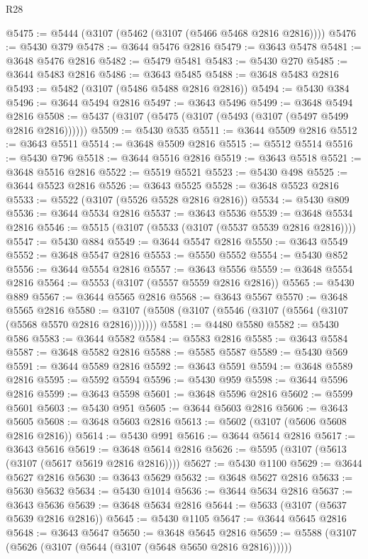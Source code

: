 \begin{lexlean}{R28}
\begin{coremodule}
@5475 := @5444 (@3107 (@5462 (@3107 (@5466 @5468 @2816 @2816))))
@5476 := @5430 @379
@5478 := @3644 @5476 @2816
@5479 := @3643 @5478
@5481 := @3648 @5476 @2816
@5482 := @5479 @5481
@5483 := @5430 @270
@5485 := @3644 @5483 @2816
@5486 := @3643 @5485
@5488 := @3648 @5483 @2816
@5493 := @5482 (@3107 (@5486 @5488 @2816 @2816))
@5494 := @5430 @384
@5496 := @3644 @5494 @2816
@5497 := @3643 @5496
@5499 := @3648 @5494 @2816
@5508 := @5437 (@3107 (@5475 (@3107 (@5493 (@3107 (@5497 @5499 @2816 @2816))))))
@5509 := @5430 @535
@5511 := @3644 @5509 @2816
@5512 := @3643 @5511
@5514 := @3648 @5509 @2816
@5515 := @5512 @5514
@5516 := @5430 @796
@5518 := @3644 @5516 @2816
@5519 := @3643 @5518
@5521 := @3648 @5516 @2816
@5522 := @5519 @5521
@5523 := @5430 @498
@5525 := @3644 @5523 @2816
@5526 := @3643 @5525
@5528 := @3648 @5523 @2816
@5533 := @5522 (@3107 (@5526 @5528 @2816 @2816))
@5534 := @5430 @809
@5536 := @3644 @5534 @2816
@5537 := @3643 @5536
@5539 := @3648 @5534 @2816
@5546 := @5515 (@3107 (@5533 (@3107 (@5537 @5539 @2816 @2816))))
@5547 := @5430 @884
@5549 := @3644 @5547 @2816
@5550 := @3643 @5549
@5552 := @3648 @5547 @2816
@5553 := @5550 @5552
@5554 := @5430 @852
@5556 := @3644 @5554 @2816
@5557 := @3643 @5556
@5559 := @3648 @5554 @2816
@5564 := @5553 (@3107 (@5557 @5559 @2816 @2816))
@5565 := @5430 @889
@5567 := @3644 @5565 @2816
@5568 := @3643 @5567
@5570 := @3648 @5565 @2816
@5580 := @3107 (@5508 (@3107 (@5546 (@3107 (@5564 (@3107 (@5568 @5570 @2816 @2816)))))))
@5581 := @4480 @5580
@5582 := @5430 @586
@5583 := @3644 @5582
@5584 := @5583 @2816
@5585 := @3643 @5584
@5587 := @3648 @5582 @2816
@5588 := @5585 @5587
@5589 := @5430 @569
@5591 := @3644 @5589 @2816
@5592 := @3643 @5591
@5594 := @3648 @5589 @2816
@5595 := @5592 @5594
@5596 := @5430 @959
@5598 := @3644 @5596 @2816
@5599 := @3643 @5598
@5601 := @3648 @5596 @2816
@5602 := @5599 @5601
@5603 := @5430 @951
@5605 := @3644 @5603 @2816
@5606 := @3643 @5605
@5608 := @3648 @5603 @2816
@5613 := @5602 (@3107 (@5606 @5608 @2816 @2816))
@5614 := @5430 @991
@5616 := @3644 @5614 @2816
@5617 := @3643 @5616
@5619 := @3648 @5614 @2816
@5626 := @5595 (@3107 (@5613 (@3107 (@5617 @5619 @2816 @2816))))
@5627 := @5430 @1100
@5629 := @3644 @5627 @2816
@5630 := @3643 @5629
@5632 := @3648 @5627 @2816
@5633 := @5630 @5632
@5634 := @5430 @1014
@5636 := @3644 @5634 @2816
@5637 := @3643 @5636
@5639 := @3648 @5634 @2816
@5644 := @5633 (@3107 (@5637 @5639 @2816 @2816))
@5645 := @5430 @1105
@5647 := @3644 @5645 @2816
@5648 := @3643 @5647
@5650 := @3648 @5645 @2816
@5659 := @5588 (@3107 (@5626 (@3107 (@5644 (@3107 (@5648 @5650 @2816 @2816))))))

\end{coremodule}
\end{lexlean}
